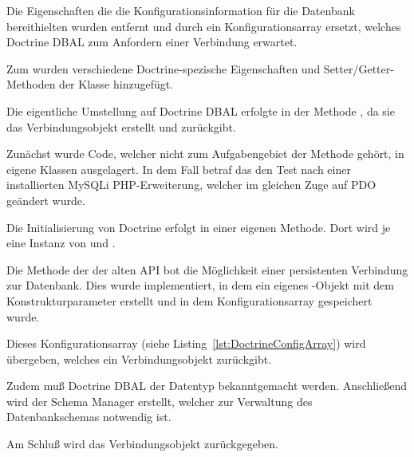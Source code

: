 Die Eigenschaften die die Konfigurationsinformation für die Datenbank bereithielten wurden entfernt und durch ein Konfigurationsarray ersetzt, welches Doctrine DBAL zum Anfordern einer Verbindung erwartet.


Zum wurden verschiedene Doctrine-spezische Eigenschaften und Setter/Getter-Methoden der Klasse hinzugefügt.

Die eigentliche Umstellung auf Doctrine DBAL erfolgte in der Methode , da sie das Verbindungsobjekt erstellt und zurückgibt.

Zunächst wurde Code, welcher nicht zum Aufgabengebiet der Methode gehört, in eigene Klassen ausgelagert. In dem Fall betraf das den Test nach einer installierten MySQLi PHP-Erweiterung, welcher im gleichen Zuge auf PDO geändert wurde.

Die Initialisierung von Doctrine erfolgt in einer eigenen Methode. Dort wird je eine Instanz von \phpinline{\Doctrine\DBAL\Configuration} und \phpinline{\Doctrine\DBAL\Schema\Schema}.

Die Methode der  der alten API bot die Möglichkeit einer persistenten Verbindung zur Datenbank. Dies wurde implementiert, in dem ein eigenes -Objekt mit dem Konstrukturparameter  erstellt und in dem Konfigurationsarray gespeichert wurde.

Dieses Konfigurationsarray (siehe Listing~\ref{lst:DoctrineConfigArray}) wird  übergeben, welches ein Verbindungsobjekt zurückgibt.

Zudem muß Doctrine DBAL der Datentyp  bekanntgemacht werden. Anschließend wird der Schema Manager erstellt, welcher zur Verwaltung des Datenbankschemas notwendig ist.

Am Schluß wird das Verbindungsobjekt zurückgegeben.

